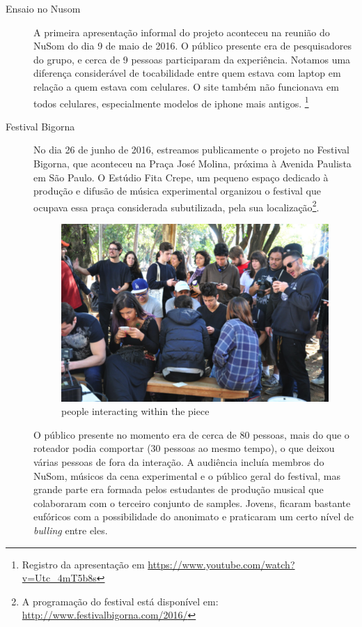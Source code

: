 \begin{description}

\item[Ensaio no Nusom] 
A primeira apresentação informal do projeto aconteceu na reunião do NuSom do dia 9 de maio de 2016. O público presente era de pesquisadores do grupo, e cerca de 9 pessoas participaram da experiência. Notamos uma diferença considerável de tocabilidade entre quem estava com laptop em relação a quem estava com celulares. O site também não funcionava em todos celulares, especialmente modelos de iphone mais antigos. \footnote{Registro da apresentação em \url{https://www.youtube.com/watch?v=Utc_4mT5b8s}}

\item[Festival Bigorna]
No dia 26 de junho de 2016, estreamos publicamente o projeto no Festival Bigorna, que aconteceu na Praça José Molina, próxima à Avenida Paulista em São Paulo. O Estúdio Fita Crepe, um pequeno espaço dedicado à produção e difusão de música experimental organizou o festival que ocupava essa praça considerada subutilizada, pela sua localização\footnote{A programação do festival está disponível em: \url{http://www.festivalbigorna.com/2016/}}.

\begin{figure}[!ht]
    
        \includegraphics[width=1\textwidth]{pictures/bigorna}
        \vspace{-10pt}
    \caption{people interacting within the piece}
    \label{fig:performer}
\end{figure}

O público presente no momento era de cerca de 80 pessoas, mais do que o roteador podia comportar (30 pessoas ao mesmo tempo), o que deixou várias pessoas de fora da interação. A audiência incluía membros do NuSom, músicos da cena experimental e o público geral do festival, mas grande parte era formada pelos estudantes de produção musical que colaboraram com o terceiro conjunto de samples. Jovens, ficaram bastante eufóricos com a possibilidade do anonimato e praticaram um certo nível de \emph{bulling} entre eles. 


\end{description}
